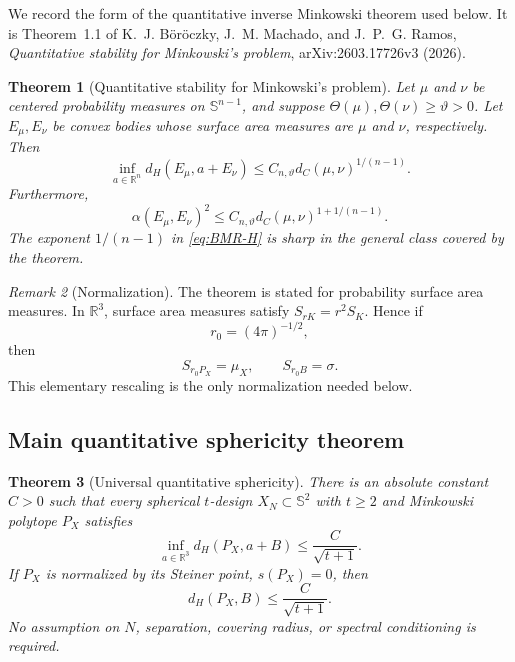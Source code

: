 \documentclass[11pt]{article}
\newtheorem{theorem}{Theorem}[section]
\theoremstyle{definition}
\theoremstyle{remark}
\newtheorem{remark}[theorem]{Remark}
\newcommand{\Sph}{\mathbb S}
\newcommand{\R}{\mathbb R}
\begin{document}
We record the form of the quantitative inverse Minkowski theorem used below. It is Theorem~1.1 of K.~J. B\"or\"oczky, J.~M. Machado, and J.~P.~G. Ramos, \emph{Quantitative stability for Minkowski's problem}, arXiv:2603.17726v3 (2026).

\begin{theorem}[Quantitative stability for Minkowski's problem]\label{thm:BMR}
Let $\mu$ and $\nu$ be centered probability measures on $\Sph^{n-1}$, and suppose $\Theta(\mu),\Theta(\nu)\ge\vartheta>0$. Let $E_\mu,E_\nu$ be convex bodies whose surface area measures are $\mu$ and $\nu$, respectively. Then
\begin{equation}\label{eq:BMR-H}
\inf_{a\in\R^n}d_H(E_\mu,a+E_\nu)
\le C_{n,\vartheta}d_C(\mu,\nu)^{1/(n-1)}.
\end{equation}
Furthermore,
\begin{equation}\label{eq:BMR-F}
\alpha(E_\mu,E_\nu)^2
\le C_{n,\vartheta}d_C(\mu,\nu)^{1+1/(n-1)}.
\end{equation}
The exponent $1/(n-1)$ in \eqref{eq:BMR-H} is sharp in the general class covered by the theorem.
\end{theorem}

\begin{remark}[Normalization]\label{rem:normalization}
The theorem is stated for probability surface area measures. In $\R^3$, surface area measures satisfy $S_{rK}=r^2S_K$. Hence if
\[
r_0=(4\pi)^{-1/2},
\]
then
\begin{equation}\label{eq:prob-normalization}
S_{r_0P_X}=\mu_X,\qquad S_{r_0B}=\sigma.
\end{equation}
This elementary rescaling is the only normalization needed below.
\end{remark}

\subsection{Main quantitative sphericity theorem}

\begin{theorem}[Universal quantitative sphericity]\label{thm:quantitative-sphericity}
There is an absolute constant $C>0$ such that every spherical $t$-design $X_N\subset\Sph^2$ with $t\ge2$ and Minkowski polytope $P_X$ satisfies
\begin{equation}\label{eq:main-H}
\inf_{a\in\R^3}d_H(P_X,a+B)\le\frac{C}{\sqrt{t+1}}.
\end{equation}
If $P_X$ is normalized by its Steiner point, $s(P_X)=0$, then
\begin{equation}\label{eq:main-H-steiner}
d_H(P_X,B)\le\frac{C}{\sqrt{t+1}}.
\end{equation}
No assumption on $N$, separation, covering radius, or spectral conditioning is required.
\end{theorem}
\end{document}
